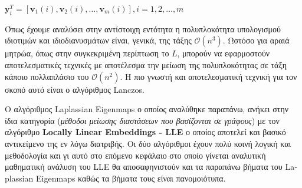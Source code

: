 $\mathbf{y}_{i}^{T} = [\mathbf{v}_{1}(i),\mathbf{v}_{2}(i),\ldots,\mathbf{v}_{m}(i)], i=1,2,\ldots,m$
\hspace*{\fill}\newline
\par
Όπως έχουμε αναλύσει στην αντίστοιχη εντότητα η πολυπλοκότητα υπολογισμού ιδιοτιμών και ιδιοδιανυσμάτων είναι, γενικά, της τάξης $\mathcal{O}(n^{3})$. Ωστόσο για αραιά μητρώα, όπως στην συγκεκριμένη περίπτωση το $L$, μπορούν να εφαρμοστούν αποτελεσματικές τεχνικές με αποτέλεσμα την μείωση της πολυπλοκότητας σε τάξη κάποιο πολλαπλάσιο του $\mathcal{O}(n^2)$. Η πιο γνωστή και αποτελεσματική τεχνική για τον σκοπό αυτό είναι ο αλγόριθμος \textlatin{Lanczos}\textlatin{\cite{lanczos}}.
\par
Ο αλγόριθμος \textlatin{Laplassian Eigenmaps}\textlatin{\cite{laplassianeigenmaps}} ο οποίος αναλύθηκε παραπάνω, ανήκει στην ίδια κατηγορία (\textit{μέθοδοι μείωσης διαστάσεων που βασίζονται σε γράφους}) με τον αλγόριθμο \textbf{\textlatin{Locally Linear Embeddings - LLE}}\textlatin{\cite{lle}} ο οποίος αποτελεί και βασικό αντικείμενο της εν λόγω διατριβής. Οι δύο αλγόριθμοι έχουν πολύ κοινή λογική και μεθοδολογία και γι αυτό στο επόμενο κεφάλαιο στο οποίο γίνεται αναλυτική μαθηματική ανάλυση του \textlatin{LLE}\textlatin{\cite{lle}} θα αποσαφηνιστούν και τα παραπάνω βήματα του \textlatin{Laplassian Eigenmaps}\textlatin{\cite{laplassianeigenmaps}} καθώς τα βήματα τους είναι πανομοιότυπα.

